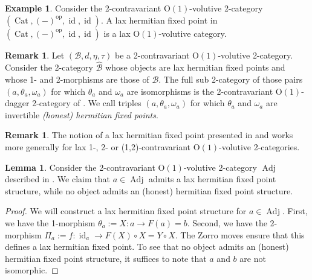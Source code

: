 \documentclass{article}
\newcommand{\opp}{\operatorname{op}}%
\newcommand{\id}{\operatorname{id}}%
\newcommand{\Cat}{\operatorname{Cat}}%
\newcommand{\Adj}{\operatorname{Adj}}%
\newcommand{\Oone}{\operatorname{O(1)}}
\newcommand{\B}{\mathcal{B}}
\numberwithin{equation}{section}
\theoremstyle{definition}
\newtheorem{example}[definition]{Example}
\newtheorem{lemma}[definition]{Lemma}
\newtheorem{remark}[definition]{Remark}
\theoremstyle{theorem}
\begin{document}
\begin{example}
    Consider the 2-contravariant $\Oone$-volutive 2-category $(\Cat,(-)^{\opp},\id,\id)$. A lax hermitian fixed point in $(\Cat,(-)^{\opp},\id,\id)$ is 
    a lax $\Oone$-volutive category. 
\end{example}
\begin{remark}\label{Remark: honest hermitian fixed points}
    Let $(\B,d,\eta,\tau)$ be a 2-contravariant $\Oone$-volutive 2-category. Consider the 2-category $\hat{\B}$ whose objects are lax hermitian fixed points 
    and whose 1- and 2-morphisms are those of $\B$. The full sub 2-category of those pairs $(a,\theta_a,\omega_a)$ for which $\theta_a$ and $\omega_a$ are 
    isomorphisms is the 2-contravariant $\Oone$-dagger 2-category of . We call triples 
    $(a,\theta_a,\omega_a)$ for which $\theta_a$ and $\omega_a$ are invertible \emph{(honest) hermitian fixed points}.
\end{remark}
\begin{remark}
    The notion of a lax hermitian fixed point presented in  and 
     works more generally for lax 1-, 2- or (1,2)-contravariant 
    $\Oone$-volutive 2-categories.
\end{remark}
\begin{lemma}\label{Lemma: lax hermitian fixed points in the walking adjunction}
    Consider the 2-contravariant $\Oone$-volutive 2-category $\Adj$ described in . 
    We claim that $a \in \Adj$ admits a lax hermitian fixed point structure, while no object admits an (honest) hermitian fixed point structure.
\end{lemma}
\begin{proof}
    We will construct a lax hermitian fixed point structure for $a \in \Adj$. First, we have the 1-morphism $\theta_a := X \colon a \to F(a)=b$. 
    Second, we have the 2-morphism $\Pi_a := f \colon \id_a \to F(X) \circ X = Y \circ X$. The Zorro moves ensure that this defines a lax hermitian fixed point.
    To see that no object admits an (honest) hermitian fixed point structure, it suffices to note that $a$ and $b$ are not isomorphic. 
\end{proof}
\end{document}
